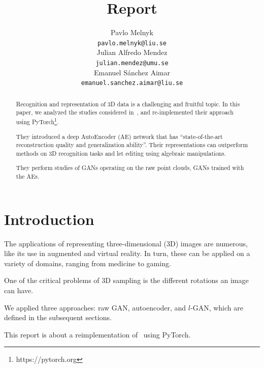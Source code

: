 \documentclass[12pt]{article}
\title{Report}
\author{
    Pavlo Melnyk \\
    \texttt{pavlo.melnyk@liu.se} \\
    \And
    Julian Alfredo Mendez \\
    \texttt{julian.mendez@umu.se} \\
    \And
    Emanuel S\'{a}nchez Aimar \\
    \texttt{emanuel.sanchez.aimar@liu.se} \\
}
\newcommand{\contentdescription}[1]{}
\begin{document}
    \maketitle

    \begin{abstract}
        \contentdescription{
            Abstract (5-10\%):
            Give an overview of what you have done in the project with the key results and findings of your work.
            Should be no more than 300 words.
        }

        Recognition and representation of 3D data is a challenging and fruitful topic.
        In this paper, we analyzed the studies considered in~\cite{pmlr-v80-achlioptas18a}, and re-implemented their approach using PyTorch\footnote{https://pytorch.org}.

        They introduced a deep AutoEncoder (AE) network that has ``state-of-the-art reconstruction quality and generalization ability''.
        Their representations can outperform methods on 3D recognition tasks and let editing using algebraic manipulations.

        They perform studies of GANs operating on the raw point clouds, GANs trained with the AEs.
    \end{abstract}


    \section{Introduction}

    \contentdescription{
        Introduction (5-15\%):
        Describe the problem, the approach of the paper, the experiments, and the results.
        At the high-level talk about what you worked on in your project and why it is important.
        Then give an overview of your results.
    }

    The applications of representing three-dimensional (3D) images are numerous, like its use in augmented and virtual reality.
    In turn, these can be applied on a variety of domains, ranging from medicine to gaming.

    One of the critical problems of 3D sampling is the different rotations an image can have.

    We applied three approaches: raw GAN, autoencoder, and $l$-GAN, which are defined in the subsequent sections.

    This report is about a reimplementation of~\cite{pmlr-v80-achlioptas18a} using PyTorch.
\end{document}
